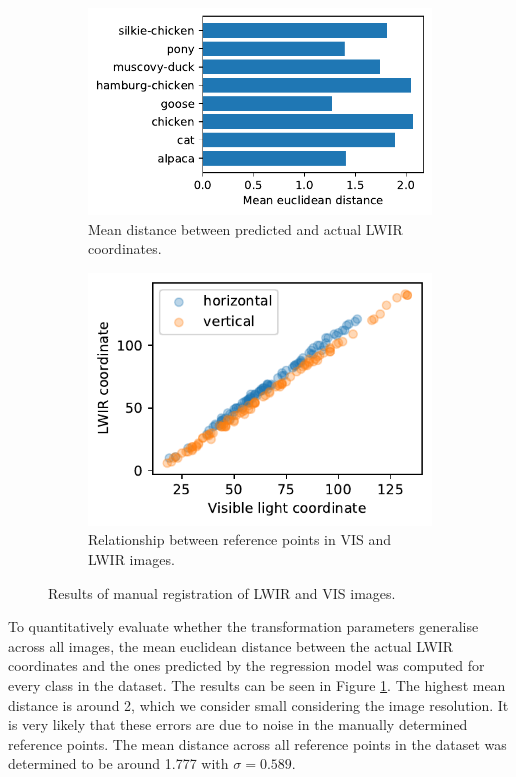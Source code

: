 \documentclass{l4proj}
\begin{document}
\begin{figure}[ht]
  \centering
  \begin{subfigure}[t]{0.45\textwidth}
    \includegraphics[width=\textwidth]{images/registration/error}
    \caption{Mean distance between predicted and actual LWIR coordinates.}
    \label{fig:registration_error}
  \end{subfigure}
  \quad
  \begin{subfigure}[t]{0.368\textwidth}
    \includegraphics[width=\textwidth]{images/registration/x_y}
    \caption{Relationship between reference points in VIS and LWIR images.}
    \label{fig:registration_relationship}
  \end{subfigure}
  \caption{Results of manual registration of LWIR and VIS images.}
\end{figure}

To quantitatively evaluate whether the transformation parameters generalise across all images, the mean euclidean distance between the actual LWIR coordinates and the ones predicted by the regression model was computed for every class in the dataset. The results can be seen in Figure \ref{fig:registration_error}. The highest mean distance is around 2, which we consider small considering the image resolution. It is very likely that these errors are due to noise in the manually determined reference points. The mean distance across all reference points in the dataset was determined to be around 1.777 with $\sigma = 0.589$.
\end{document}
